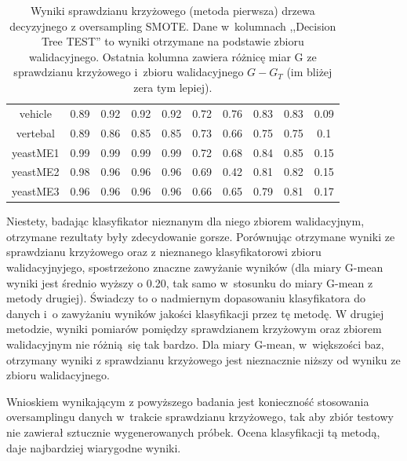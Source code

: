 \begin{table}[h]
\begin{center}
{\begin{tabular}{|c|c|c|c|c|c|c|c|c|c|}
				vehicle&0.89&0.92&0.92&0.92&0.72&0.76&0.83&0.83&0.09\\%
				vertebal&0.89&0.86&0.85&0.85&0.73&0.66&0.75&0.75&0.1\\%
				yeastME1&0.99&0.99&0.99&0.99&0.72&0.68&0.84&0.85&0.15\\%
				yeastME2&0.98&0.96&0.96&0.96&0.69&0.42&0.81&0.82&0.15\\%
				yeastME3&0.96&0.96&0.96&0.96&0.66&0.65&0.79&0.81&0.17\\%
				\hline%
			\end{tabular}}%
			\caption[Wyniki sprawdzianu krzyżowego z metodą SMOTE, metoda pierwsza]{Wyniki sprawdzianu krzyżowego (metoda pierwsza) drzewa decyzyjnego z oversampling SMOTE. Dane w~kolumnach ,,Decision Tree TEST'' to wyniki otrzymane na podstawie zbioru walidacyjnego. Ostatnia kolumna zawiera różnicę  miar G ze sprawdzianu krzyżowego i~zbioru walidacyjnego $G-G_T$ (im bliżej zera tym lepiej).}
			\label{CVoversampling1}
		\end{center}
	\end{table}
Niestety, badając klasyfikator nieznanym dla niego zbiorem walidacyjnym, otrzymane rezultaty były zdecydowanie gorsze. Porównując otrzymane wyniki ze sprawdzianu krzyżowego oraz z nieznanego klasyfikatorowi zbioru walidacyjnyjego, spostrzeżono znaczne zawyżanie wyników (dla miary G-mean wyniki jest średnio wyższy o 0.20, tak samo w~stosunku do miary G-mean z metody drugiej). Świadczy to o nadmiernym dopasowaniu klasyfikatora do danych i~o zawyżaniu wyników jakości klasyfikacji przez tę metodę. W drugiej metodzie, wyniki pomiarów pomiędzy sprawdzianem krzyżowym oraz zbiorem walidacyjnym nie różnią się tak bardzo. Dla miary G-mean, w~większości baz, otrzymany wyniki z sprawdzianu krzyżowego jest nieznacznie niższy od wyniku ze zbioru walidacyjnego. \par
Wnioskiem wynikającym z powyższego badania jest konieczność stosowania oversamplingu danych w~trakcie sprawdzianu krzyżowego, tak aby zbiór testowy nie zawierał sztucznie wygenerowanych próbek. Ocena klasyfikacji tą metodą, daje najbardziej wiarygodne wyniki.



